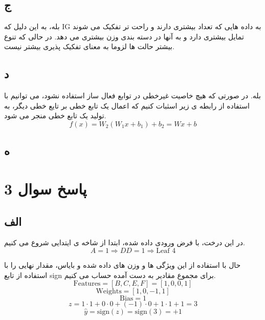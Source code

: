 \documentclass{article}
\begin{document}
\subsection{ج}
بله، به این دلیل که IG به داده هایی که تعداد بیشتری دارند و راحت تر تفکیک می شوند تمایل بیشتری دارد و به آنها در دسته بندی وزن بیشتری می دهد. در حالی که تنوع بیشتر حالت ها لزوما به معنای تفکیک پذیری بیشتر نیست.
\subsection{د}
بله. در صورتی که هیچ خاصیت غیرخطی در توابع فعال ساز استفاده نشود، می توانیم با استفاده از رابطه ی زیر اسثبات کنیم که اعمال یک تابع خطی بر تایع خطی دیگر، به تولید یک تابع خطی منجر می شود.
\begin{equation}
	f(x) = W_2 (W_1 x + b_1) + b_2 = W x + b
\end{equation}

\subsection{ه}

\section{پاسخ سوال 3}
\subsection{الف}
در این درخت، با فرض ورودی داده شده، ابتدا از شاخه ی ایتدایی شروع می کنیم.
\begin{equation}
	A = 1 \Rightarrow D
	D = 1 \Rightarrow \text{Leaf 4}
\end{equation}

حال با استفاده از این ویژگی ها و وزن های داده شده و بایاس، مقدار نهایی را با استفاده از تابع sign برای مجموع مقادیر به دست آمده حساب می کنیم.
\begin{equation}
	\text{Features} = [B, C, E, F] = [1, 0, 0, 1]
\end{equation}
\begin{equation}
	\text{Weights} = [1, 0, -1, 1]
\end{equation}
\begin{equation}
	\text{Bias} = 1
\end{equation}
\begin{equation}
z = 1 \cdot 1 + 0 \cdot 0 + (-1) \cdot 0 + 1 \cdot 1 + 1 = 3
\end{equation}
\begin{equation}
\hat{y} = \text{sign}(z) = \text{sign}(3) = +1

\end{equation}
\end{document}
